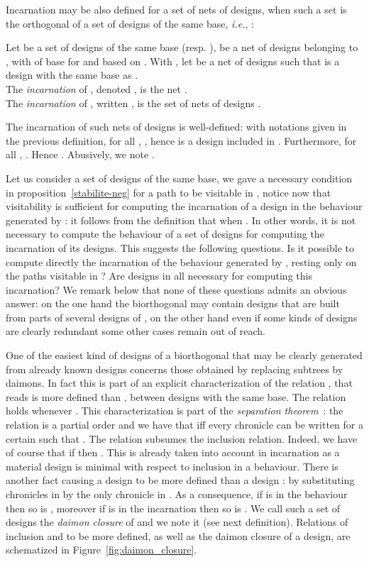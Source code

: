 \documentclass{LMCS}
\def\ie{{\em i.e.}}
\begin{document}
Incarnation may be also defined for a set  of nets of designs, when such a set  is the orthogonal of a set  of designs of the same base, \ie, :
\begin{defi}
Let  be a set of designs of the same base  (resp. ),  be a net of designs belonging to , with  of base  for  and  based on . 
With , let  be a net of designs such that  is a design with the same base as .\\
The {\em incarnation} of , denoted , is the net .\\
The {\em incarnation} of , written , is the set of nets of designs .
\end{defi}

The incarnation of such nets of designs is well-defined: with notations given in the previous definition, for all , , hence  is a design included in .
Furthermore, for all , . Hence .
Abusively, we note .

\vspace{.5cm}
Let us consider a set of designs  of the same base, we
gave a necessary condition in proposition~\ref{stabilite-neg} for a path to be visitable in ,
 notice now that visitability is sufficient for computing the incarnation of a design in the behaviour generated by : it follows from the definition that  when . 
In other words, it is not necessary to compute the behaviour of a set of designs for computing the incarnation of its designs.
This suggests the following questions. Is it possible to compute directly the incarnation of the behaviour generated by , resting only on the paths visitable in ? 
Are designs in  all necessary for computing this incarnation?
We remark below that none of these questions admits an obvious answer: on the one hand the biorthogonal may contain designs that are built from parts of several designs of , on the other hand even if some kinds of designs are clearly redundant some other cases remain out of reach. 

One of the easiest kind of designs of a biorthogonal that may be clearly generated from already known designs concerns those obtained by replacing subtrees by daimons.
In fact this is part of an explicit characterization of the relation , that reads  is more defined than , between designs with the same base. The relation  holds whenever .
This characterization is part of the {\em separation theorem}~\cite{DBLP:journals/mscs/Girard01}:
the relation  is a partial order and we have that  iff every chronicle  can be written  for a certain  such that .
The relation  subsumes the inclusion relation. Indeed, we have of course that if  then . 
This is already taken into account in incarnation as a material design is minimal with respect to inclusion in a behaviour.
There is another fact causing a design  to be more defined than a design : by substituting chronicles  in  by the only chronicle  in . As a consequence, if  is in the behaviour  then so is , moreover if  is in the incarnation  then so is .
We call such a set of designs  the {\em daimon closure} of  and we note it  (see next definition). 
Relations of inclusion and to be more defined, as well as the daimon closure of a design, are schematized in Figure~\ref{fig:daimon_closure}.
\end{document}
